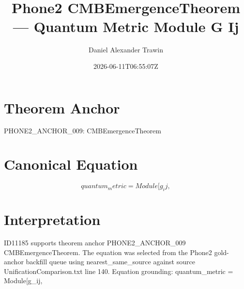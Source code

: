 \documentclass[11pt]{article}
\title{Phone2 CMBEmergenceTheorem — Quantum Metric Module G Ij}
\author{Daniel Alexander Trawin}
\date{2026-06-11T06:55:07Z}
\begin{document}
\maketitle
\section*{Theorem Anchor}
PHONE2_ANCHOR_009: CMBEmergenceTheorem
\section*{Canonical Equation}
\[
quantum_metric = Module[{g_ij},
\]
\section*{Interpretation}
ID11185 supports theorem anchor PHONE2_ANCHOR_009 CMBEmergenceTheorem. The equation was selected from the Phone2 gold-anchor backfill queue using nearest_same_source against source UnificationComparison.txt line 140. Equation grounding: quantum_metric = Module[{g_ij},
\end{document}
